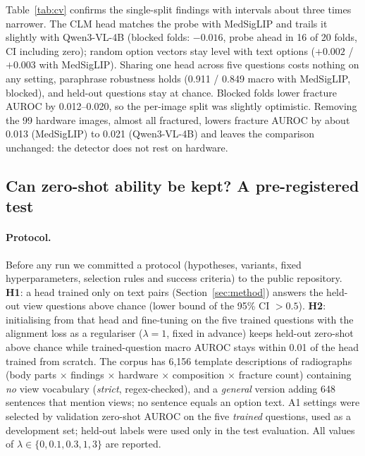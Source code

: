 \documentclass[11pt]{article}
\begin{document}
Table~\ref{tab:cv} confirms the single-split findings with intervals about three times narrower. The CLM head
matches the probe with MedSigLIP and trails it slightly with Qwen3-VL-4B (blocked folds: $-0.016$, probe ahead in 16
of 20 folds, CI including zero); random option vectors stay level with text options ($+0.002$ / $+0.003$ with
MedSigLIP). Sharing one head across five questions costs nothing on any setting, paraphrase robustness holds (0.911 /
0.849 macro with MedSigLIP, blocked), and held-out questions stay at chance. Blocked folds lower fracture AUROC by
0.012--0.020, so the per-image split was slightly optimistic. Removing the 99 hardware images, almost all fractured,
lowers fracture AUROC by about 0.013 (MedSigLIP) to 0.021 (Qwen3-VL-4B) and leaves the comparison unchanged: the
detector does not rest on hardware.

\subsection{Can zero-shot ability be kept? A pre-registered test}
\label{sec:align}

\paragraph{Protocol.} Before any run we committed a protocol (hypotheses, variants, fixed hyperparameters,
selection rules and success criteria) to the public repository. \textbf{H1}: a head trained only on text pairs
(Section~\ref{sec:method}) answers the held-out view questions above chance (lower bound of the 95\% CI $>0.5$).
\textbf{H2}: initialising from that head and fine-tuning on the five trained questions with the alignment loss as a
regulariser ($\lambda=1$, fixed in advance) keeps held-out zero-shot above chance while trained-question macro AUROC
stays within 0.01 of the head trained from scratch. The corpus has 6{,}156 template descriptions of radiographs
(body parts $\times$ findings $\times$ hardware $\times$ composition $\times$ fracture count) containing \emph{no}
view vocabulary (\emph{strict}, regex-checked), and a \emph{general} version adding 648 sentences that mention
views; no sentence equals an option text. A1 settings were selected by validation zero-shot AUROC on the five
\emph{trained} questions, used as a development set; held-out labels were used only in the test evaluation. All
values of $\lambda\in\{0, 0.1, 0.3, 1, 3\}$ are reported.
\end{document}
